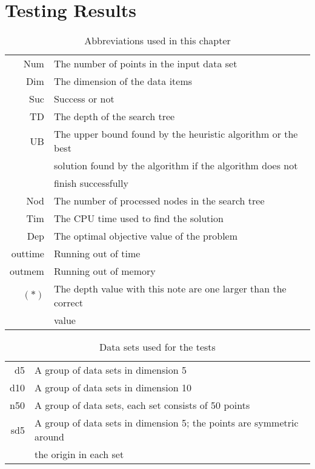 \appendix

\chapter{Testing Results}
\label{chap:apd}

\begin{table}[!htb]
  \centering
  \begin{tabular}[center]{|r|l|}
    \hline
    Num & The number of points in the input data set \\
    Dim & The dimension of the data items \\
    Suc & Success or not \\
    TD & The depth of the search tree \\
    UB & The upper bound found by the heuristic algorithm or the best\\
    &solution found by the algorithm if the algorithm does not\\
    &finish successfully \\
    Nod & The number of processed nodes in the search tree \\
    Tim & The CPU time used to find the solution \\
    Dep & The optimal objective value of the problem \\
    outtime & Running out of time\\
    outmem & Running out of memory\\
    $(*)$ & The depth value with this note are one larger than the correct\\
    &value\\
    \hline
  \end{tabular}
  \caption{Abbreviations used in this chapter}
  \label{tab:test.abb}
\end{table}

\begin{table}[!htb]
  \centering
  \begin{tabular}[center]{|r|l|}
    \hline
    d5 & A group of data sets in dimension 5\\
    d10 & A group of data sets in dimension 10\\
    n50 & A group of data sets, each set consists of 50 points\\
    sd5 & A group of data sets in dimension 5; the points are symmetric around\\
        & the origin in each set\\
    \hline
  \end{tabular}
  \caption{Data sets used for the tests}
  \label{tab:test.datasets}
\end{table}


